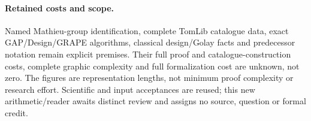 \documentclass[11pt,a4paper]{article}
\begin{document}
\paragraph{Retained costs and scope.}
Named Mathieu-group identification, complete TomLib catalogue data, exact
GAP/Design/GRAPE algorithms, classical design/Golay facts and predecessor
notation remain explicit premises. Their full proof and catalogue-construction
costs, complete graphic complexity and full formalization cost are unknown,
not zero. The figures are representation lengths, not minimum proof complexity
or research effort. Scientific and input acceptances are reused; this new
arithmetic/reader awaits distinct review and assigns no source, question or
formal credit.
\end{document}
